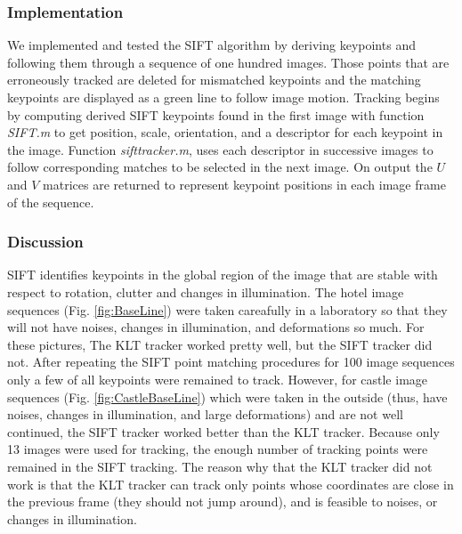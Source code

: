 \documentclass{article}
\begin{document}
\subsubsection{Implementation}
We implemented and tested the SIFT algorithm by deriving keypoints and following them through a sequence of one hundred images.  
Those points that are erroneously tracked are deleted for mismatched keypoints and the matching keypoints are displayed as a green line to follow image motion. 
Tracking begins by computing derived SIFT keypoints found in the first image with function {\em SIFT.m} to get  position, scale, orientation, and a descriptor for each keypoint in the image. 
Function {\em sifttracker.m}, uses each descriptor in successive images to follow corresponding matches to be selected in the next image. 
On output the $U$ and $V$ matrices are returned to represent keypoint positions in each image frame of the sequence. 

\subsubsection{Discussion}
SIFT identifies keypoints in the global region of the image that are stable with respect to rotation, clutter and changes in illumination.  
The hotel image sequences (Fig. \ref{fig:BaseLine}) were taken careafully in a laboratory so that they will not have noises, changes in illumination, and deformations so much. For these pictures, 
The KLT tracker worked pretty well, but the SIFT tracker did not. 
After repeating the SIFT point matching procedures for 100 image sequences only a few of all keypoints were remained to track. 
However, for castle image sequences (Fig. \ref{fig:CastleBaseLine}) which were taken in the outside (thus, have noises, changes in illumination, and large deformations) and are not well continued, the SIFT tracker worked better than the KLT tracker. 
Because only 13 images were used for tracking, the enough number of tracking points were remained in the SIFT tracking. 
The reason why that the KLT tracker did not work is that the KLT tracker can track only points whose coordinates are close in the previous frame (they should not jump around), and is feasible to noises, or changes in illumination. 

\end{document}
